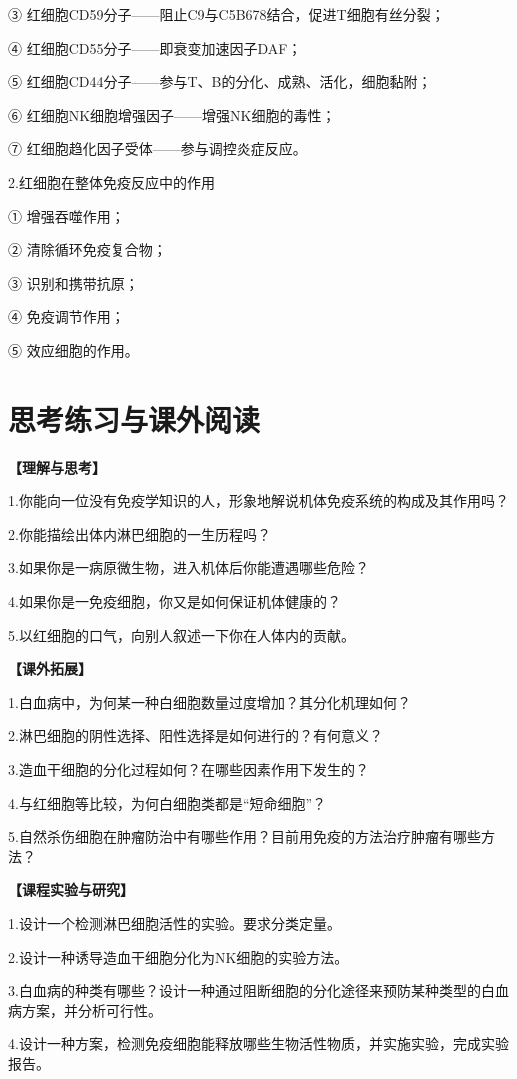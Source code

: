③ 红细胞CD59分子------阻止C9与C5B678结合，促进T细胞有丝分裂；

④ 红细胞CD55分子------即衰变加速因子DAF；

⑤ 红细胞CD44分子------参与T、B的分化、成熟、活化，细胞黏附；

⑥ 红细胞NK细胞增强因子------增强NK细胞的毒性；

⑦ 红细胞趋化因子受体------参与调控炎症反应。

2.红细胞在整体免疫反应中的作用

① 增强吞噬作用；

② 清除循环免疫复合物；

③ 识别和携带抗原；

④ 免疫调节作用；

⑤ 效应细胞的作用。

\section{思考练习与课外阅读}
\noindent\textbf{【理解与思考】}

1.你能向一位没有免疫学知识的人，形象地解说机体免疫系统的构成及其作用吗？

2.你能描绘出体内淋巴细胞的一生历程吗？

3.如果你是一病原微生物，进入机体后你能遭遇哪些危险？

4.如果你是一免疫细胞，你又是如何保证机体健康的？

5.以红细胞的口气，向别人叙述一下你在人体内的贡献。

\noindent\textbf{【课外拓展】}

1.白血病中，为何某一种白细胞数量过度增加？其分化机理如何？

2.淋巴细胞的阴性选择、阳性选择是如何进行的？有何意义？

3.造血干细胞的分化过程如何？在哪些因素作用下发生的？

4.与红细胞等比较，为何白细胞类都是“短命细胞”？

5.自然杀伤细胞在肿瘤防治中有哪些作用？目前用免疫的方法治疗肿瘤有哪些方法？

\noindent\textbf{【课程实验与研究】}

1.设计一个检测淋巴细胞活性的实验。要求分类定量。

2.设计一种诱导造血干细胞分化为NK细胞的实验方法。

3.白血病的种类有哪些？设计一种通过阻断细胞的分化途径来预防某种类型的白血病方案，并分析可行性。

4.设计一种方案，检测免疫细胞能释放哪些生物活性物质，并实施实验，完成实验报告。

